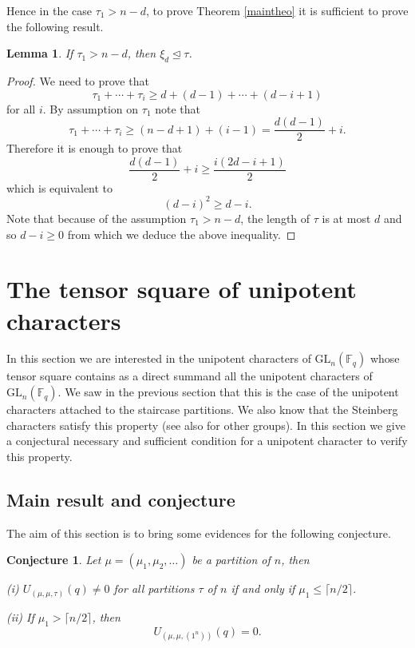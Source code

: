 \documentclass[11pt]{article}
\newtheorem{lemm}[theo]{Lemma}
\newtheorem{conj}[theo]{Conjecture}
\theoremstyle{definition}
\numberwithin{equation}{section}
\newcommand{\GL}{\mathrm{GL}}
\newcommand{\F}{\mathbb{F}}
\begin{document}
Hence in the case $\tau_1>n-d$,  to prove Theorem \ref{maintheo}  it is sufficient to prove the following result.

\begin{lemm}If $\tau_1>n-d$, then $\xi_d\trianglelefteq \tau$.
\end{lemm}

\begin{proof}We need to prove that
	$$
	\tau_1+\cdots+\tau_i\geq d+(d-1)+\cdots+(d-i+1)
	$$
	for all $i$.
	By assumption on $\tau_1$ note that
	$$
	\tau_1+\cdots+\tau_i\geq (n-d+1)+(i-1)=\frac{d(d-1)}{2}+i.
	$$
	Therefore it is enough to prove that
	$$
	\frac{d(d-1)}{2}+i\geq \frac{i(2d-i+1)}{2}
	$$
	which is equivalent to 
	$$
	(d-i)^2\geq d-i.
	$$
	Note that because of the assumption $\tau_1>n-d$, the length of $\tau$ is at most $d$ and so $d-i\geq 0$ from which we deduce the above inequality.
\end{proof}

\section{The tensor square of unipotent characters}\label{tensor}

In this section we are interested  in the unipotent characters of $\GL_n(\F_q)$ whose tensor square contains as a direct summand all the unipotent characters of $\GL_n(\F_q)$. We saw in the previous section that this is the case of the unipotent characters attached to the staircase partitions. We also know that the Steinberg characters satisfy this property \cite[Proposition 33]{L1} (see also \cite{HSTZ} for other groups). In this section we give a conjectural necessary and sufficient condition for a unipotent character to verify this property.



\subsection{Main result and conjecture}


The aim of this section is to bring some evidences for the following conjecture.

\begin{conj} Let $\mu=(\mu_1,\mu_2,\dots)$ be a partition of $n$, then 
	
	(i) $U_{(\mu,\mu,\tau)}(q)\neq 0$ for all partitions $\tau$ of $n$  if and only if $\mu_1\leq \lceil n/2\rceil$.
	
	(ii) If  $\mu_1>\lceil n/2\rceil$, then 
	$$
	U_{(\mu,\mu,(1^n))}(q)= 0.
	$$
	\label{conj}\end{conj}
\end{document}
